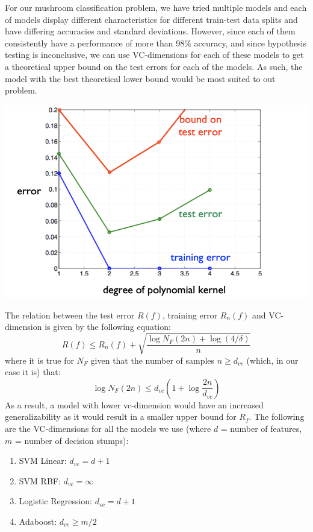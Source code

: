 \documentclass[fleqn]{article}
\begin{document}
    For our mushroom classification problem, we have tried multiple models and each of
    models display different characteristics for different train-test data splits and have
    differing accuracies and standard deviations. However, since each of them consistently
    have a performance of more than 98\% accuracy, and since hypothesis testing is
    inconclusive, we can use VC-dimensions for each of these models to get a theoretical
    upper bound on the test errors for each of the models. As such, the model with the best
    theoretical lower bound would be most suited to out problem.\\

    \begin{center}
        \includegraphics[scale=0.75]{vc.png}
    \end{center}

    The relation between the test error $ R(f) $, training error $ R_n(f) $ and VC-dimension
    is given by the following equation:
        $$ R(f) \leq R_n(f) + \sqrt{\frac{\log N_F(2n) + \log (4/\delta)}{n}} $$
    where it is true for $ N_F $ given that the number of samples $ n \geq d_{vc}$ (which, in
    our case it is) that:
        $$ \log N_F(2n) \leq d_{vc} \left(1+\log\frac{2n}{d_{vc}}\right) $$
    As a result, a model with lower vc-dimension would have an increased generalizability
    as it would result in a smaller upper bound for $ R_f $. The following are the
    VC-dimensions for all the models we use (where $ d $ = number of features,
    $ m $ = number of decision stumps):

    \begin{multicols}{2}
        \begin{enumerate}
            \item SVM Linear: $ d_{vc} = d + 1 $
            \item SVM RBF: $ d_{vc} = \infty $
            \item Logistic Regression: $ d_{vc} = d + 1 $
            \item Adaboost: $ d_{vc} \geq m/2 $
        \end{enumerate}
    \end{multicols}
\end{document}
